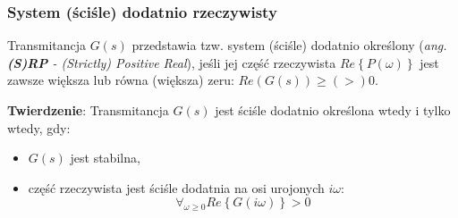 \documentclass{article}
\begin{document}
        \subsubsection{System (ściśle) dodatnio rzeczywisty}\label{sec:spr}
        Transmitancja $G(s)$ przedstawia tzw. system (ściśle) dodatnio określony (\textit{ang.} \textit{\textbf{(S)RP} - (Strictly) Positive Real}), jeśli jej część rzeczywista $Re\left\{P(\omega)\right\}$ jest zawsze większa lub równa (większa) zeru: $Re(G(s)) \geq (>) 0$.

        \textbf{Twierdzenie}: Transmitancja $G(s)$ jest ściśle dodatnio określona wtedy i tylko wtedy, gdy:
        \begin{itemize}
            \item $G(s)$ jest stabilna,
            \item część rzeczywista jest ściśle dodatnia na osi urojonych $i\omega$:
            $$
                \forall_{\omega \geq 0}Re\left\{ G(i\omega) \right\} > 0
            $$
        \end{itemize}
\end{document}
